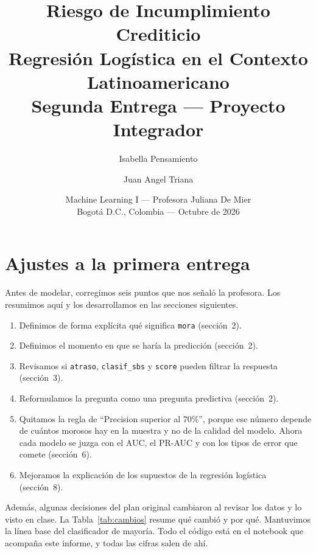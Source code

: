 \documentclass[11pt,a4paper]{article}
\title{Riesgo de Incumplimiento Crediticio\\Regresión Logística en el Contexto Latinoamericano\\[0.4em]
\large Segunda Entrega --- Proyecto Integrador}
\author{Isabella Pensamiento \and Juan Angel Triana}
\date{Machine Learning I --- Profesora Juliana De Mier\\Bogotá D.C., Colombia --- Octubre de 2026}
\begin{document}
\maketitle
\thispagestyle{empty}
\setcounter{page}{1}

\section{Ajustes a la primera entrega}

Antes de modelar, corregimos seis puntos que nos señaló la profesora. Los resumimos aquí y los desarrollamos en las secciones siguientes.

\begin{enumerate}
  \item Definimos de forma explícita qué significa \texttt{mora} (sección~2).
  \item Definimos el momento en que se haría la predicción (sección~2).
  \item Revisamos si \texttt{atraso}, \texttt{clasif\_sbs} y \texttt{score} pueden filtrar la respuesta (sección~3).
  \item Reformulamos la pregunta como una pregunta predictiva (sección~2).
  \item Quitamos la regla de ``Precision superior al 70\%'', porque ese número depende de cuántos morosos hay en la muestra y no de la calidad del modelo. Ahora cada modelo se juzga con el AUC, el PR-AUC y con los tipos de error que comete (sección~6).
  \item Mejoramos la explicación de los supuestos de la regresión logística (sección~8).
\end{enumerate}

Además, algunas decisiones del plan original cambiaron al revisar los datos y lo visto en clase. La Tabla~\ref{tab:cambios} resume qué cambió y por qué. Mantuvimos la línea base del clasificador de mayoría. Todo el código está en el notebook que acompaña este informe, y todas las cifras salen de ahí.
\end{document}
